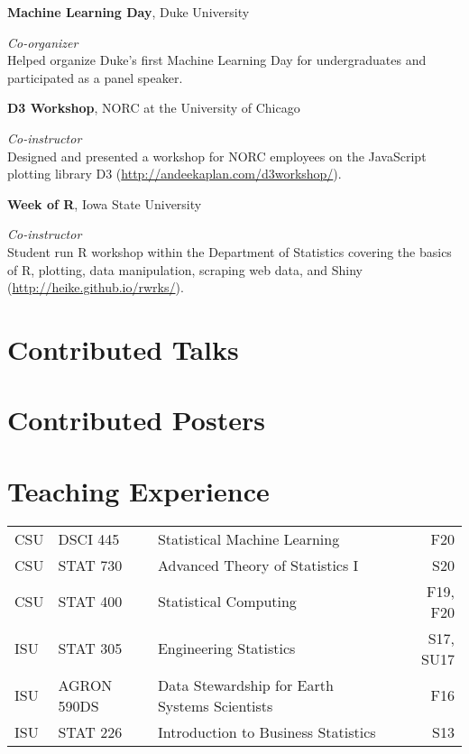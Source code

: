 \documentclass[margin,line]{res}
\begin{document}
\begin{resume}
{\bf Machine Learning Day}, Duke University

\vspace{-.3cm}
{\em Co-organizer} \hfill \\
Helped organize Duke's first Machine Learning Day for undergraduates and participated as a panel speaker.

{\bf D3 Workshop}, NORC at the University of Chicago

\vspace{-.3cm}
{\em Co-instructor} \hfill \\
Designed and presented a workshop for NORC employees on the JavaScript plotting library D3 (\url{http://andeekaplan.com/d3workshop/}).

{\bf Week of R}, Iowa State University

\vspace{-.3cm}
{\em Co-instructor} \hfill \\
Student run R workshop within the Department of Statistics covering the basics of R, plotting, data manipulation, scraping web data, and Shiny (\url{http://heike.github.io/rwrks/}).


\section{\sc Contributed Talks}
\printbibliography[keyword=talk-contributed, heading=none, resetnumbers=true]

\section{\sc Contributed Posters}
\printbibliography[keyword=poster, heading=none, resetnumbers=true]

\section{\sc Teaching Experience}

\begin{table}[H]
\begin{tabular}{l l l r}
CSU & DSCI 445 & Statistical Machine Learning & F20 \\
CSU & STAT 730 & Advanced Theory of Statistics I & S20 \\
CSU & STAT 400 & Statistical Computing & F19, F20 \\
ISU & STAT 305 & Engineering Statistics & S17, SU17 \\
ISU & AGRON 590DS & Data Stewardship for Earth Systems Scientists & F16 \\
ISU & STAT 226 & Introduction to Business Statistics & S13 \\
\end{tabular}
\end{table}


\end{resume}
\end{document}
